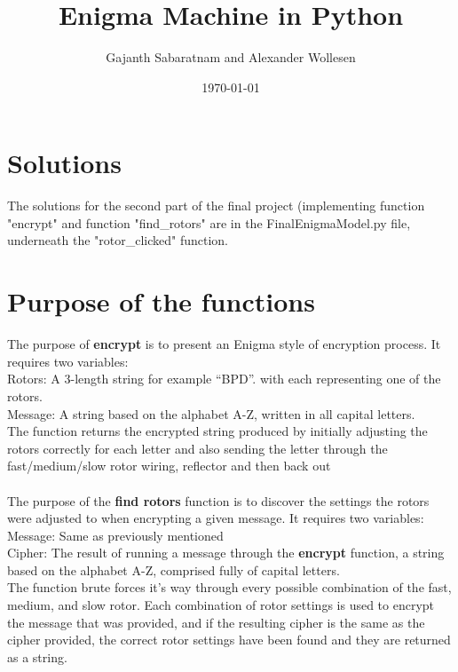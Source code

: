 \documentclass[12pt]{article}
\title{ Enigma Machine in Python}
\author{ Gajanth Sabaratnam and Alexander Wollesen }
\date{\today}
\begin{document}
\maketitle	
\pagebreak



\section{Solutions}

The solutions for the second part of the final project (implementing function "encrypt" and function "find\_rotors" are in the FinalEnigmaModel.py file, underneath the "rotor\_clicked" function.

\section{Purpose of the functions}

The purpose of \textbf{encrypt} is to present an Enigma style of encryption process. It requires two variables:\\ 
Rotors: A 3-length string for example “BPD”. with each representing one of the rotors.  \\ 
Message: A string based on the alphabet A-Z, written in all capital letters. \\
The function returns the encrypted string produced by initially adjusting the rotors correctly for each letter and also sending the letter through the fast/medium/slow rotor wiring, reflector and then back out  \\
\\
The purpose of the \textbf{find rotors} function is to discover the settings the rotors were adjusted to when encrypting a given message. It requires two variables: \\
Message: Same as previously mentioned \\
Cipher: The result of running a message through the \textbf{encrypt} function, a string based on the alphabet A-Z, comprised fully of capital letters. \\
The function brute forces it's way through every possible combination of the fast, medium, and slow rotor. Each combination of rotor settings is used to encrypt the message that was provided, and if the resulting cipher is the same as the cipher provided, the correct rotor settings have been found and they are returned as a string. \\
\end{document}
